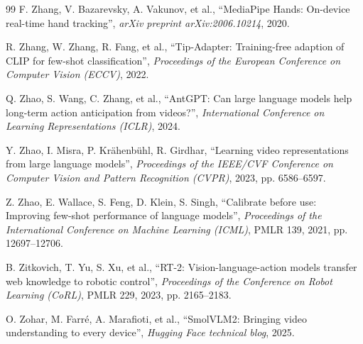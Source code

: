 \documentclass[a4paper,oneside]{report}
\begin{document}
{\begin{thebibliography}{99}
F. Zhang, V. Bazarevsky, A. Vakunov, et al., ``MediaPipe Hands: On-device real-time hand tracking'', \emph{arXiv preprint arXiv:2006.10214}, 2020.

R. Zhang, W. Zhang, R. Fang, et al., ``Tip-Adapter: Training-free adaption of CLIP for few-shot classification'', \emph{Proceedings of the European Conference on Computer Vision (ECCV)}, 2022.

Q. Zhao, S. Wang, C. Zhang, et al., ``AntGPT: Can large language models help long-term action anticipation from videos?'', \emph{International Conference on Learning Representations (ICLR)}, 2024.

Y. Zhao, I. Misra, P. Kr\"ahenb\"uhl, R. Girdhar, ``Learning video representations from large language models'', \emph{Proceedings of the IEEE/CVF Conference on Computer Vision and Pattern Recognition (CVPR)}, 2023, pp. 6586--6597.

Z. Zhao, E. Wallace, S. Feng, D. Klein, S. Singh, ``Calibrate before use: Improving few-shot performance of language models'', \emph{Proceedings of the International Conference on Machine Learning (ICML)}, PMLR 139, 2021, pp. 12697--12706.

B. Zitkovich, T. Yu, S. Xu, et al., ``RT-2: Vision-language-action models transfer web knowledge to robotic control'', \emph{Proceedings of the Conference on Robot Learning (CoRL)}, PMLR 229, 2023, pp. 2165--2183.

O. Zohar, M. Farr\'e, A. Marafioti, et al., ``SmolVLM2: Bringing video understanding to every device'', \emph{Hugging Face technical blog}, 2025.

\end{thebibliography}}
\end{document}
